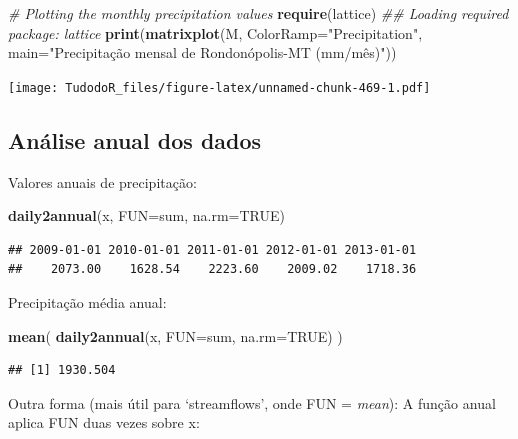 \documentclass[
]{book}
\newenvironment{Shaded}{\begin{snugshade}}{\end{snugshade}}
\newcommand{\CommentTok}[1]{\textcolor[rgb]{0.56,0.35,0.01}{\textit{#1}}}
\newcommand{\DataTypeTok}[1]{\textcolor[rgb]{0.13,0.29,0.53}{#1}}
\newcommand{\KeywordTok}[1]{\textcolor[rgb]{0.13,0.29,0.53}{\textbf{#1}}}
\newcommand{\NormalTok}[1]{#1}
\newcommand{\OtherTok}[1]{\textcolor[rgb]{0.56,0.35,0.01}{#1}}
\newcommand{\StringTok}[1]{\textcolor[rgb]{0.31,0.60,0.02}{#1}}
\begin{document}
\begin{Shaded}
\begin{Highlighting}[]
\CommentTok{# Plotting the monthly precipitation values}
\KeywordTok{require}\NormalTok{(lattice)}
\CommentTok{## Loading required package: lattice}
\KeywordTok{print}\NormalTok{(}\KeywordTok{matrixplot}\NormalTok{(M, }\DataTypeTok{ColorRamp=}\StringTok{"Precipitation"}\NormalTok{,}
\DataTypeTok{main=}\StringTok{"Precipitação mensal de Rondonópolis-MT (mm/mês)"}\NormalTok{))}
\end{Highlighting}
\end{Shaded}

\texttt{[image: TudodoR\_files/figure-latex/unnamed-chunk-469-1.pdf]}

\hypertarget{anuxe1lise-anual-dos-dados}{%
\subsection{Análise anual dos dados}\label{anuxe1lise-anual-dos-dados}}

Valores anuais de precipitação:

\begin{Shaded}
\begin{Highlighting}[]
\KeywordTok{daily2annual}\NormalTok{(x, }\DataTypeTok{FUN=}\NormalTok{sum, }\DataTypeTok{na.rm=}\OtherTok{TRUE}\NormalTok{)}
\end{Highlighting}
\end{Shaded}

\begin{verbatim}
## 2009-01-01 2010-01-01 2011-01-01 2012-01-01 2013-01-01 
##    2073.00    1628.54    2223.60    2009.02    1718.36
\end{verbatim}

Precipitação média anual:

\begin{Shaded}
\begin{Highlighting}[]
\KeywordTok{mean}\NormalTok{( }\KeywordTok{daily2annual}\NormalTok{(x, }\DataTypeTok{FUN=}\NormalTok{sum, }\DataTypeTok{na.rm=}\OtherTok{TRUE}\NormalTok{) )}
\end{Highlighting}
\end{Shaded}

\begin{verbatim}
## [1] 1930.504
\end{verbatim}

Outra forma (mais útil para `streamflows', onde FUN = \emph{mean}): A função anual aplica FUN duas vezes sobre x:
\end{document}
